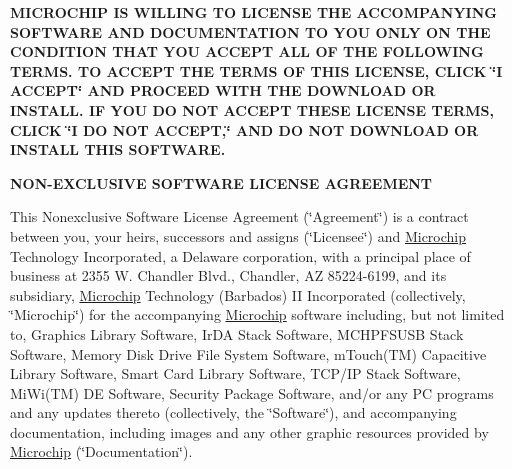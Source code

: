 {\bfseries M\+I\+C\+R\+O\+C\+H\+I\+P I\+S W\+I\+L\+L\+I\+N\+G T\+O L\+I\+C\+E\+N\+S\+E T\+H\+E A\+C\+C\+O\+M\+P\+A\+N\+Y\+I\+N\+G S\+O\+F\+T\+W\+A\+R\+E A\+N\+D D\+O\+C\+U\+M\+E\+N\+T\+A\+T\+I\+O\+N T\+O Y\+O\+U O\+N\+L\+Y O\+N T\+H\+E C\+O\+N\+D\+I\+T\+I\+O\+N T\+H\+A\+T Y\+O\+U A\+C\+C\+E\+P\+T A\+L\+L O\+F T\+H\+E F\+O\+L\+L\+O\+W\+I\+N\+G T\+E\+R\+M\+S. T\+O A\+C\+C\+E\+P\+T T\+H\+E T\+E\+R\+M\+S O\+F T\+H\+I\+S L\+I\+C\+E\+N\+S\+E, C\+L\+I\+C\+K \char`\"{}\+I A\+C\+C\+E\+P\+T\char`\"{} A\+N\+D P\+R\+O\+C\+E\+E\+D W\+I\+T\+H T\+H\+E D\+O\+W\+N\+L\+O\+A\+D O\+R I\+N\+S\+T\+A\+L\+L. I\+F Y\+O\+U D\+O N\+O\+T A\+C\+C\+E\+P\+T T\+H\+E\+S\+E L\+I\+C\+E\+N\+S\+E T\+E\+R\+M\+S, C\+L\+I\+C\+K \char`\"{}\+I D\+O N\+O\+T A\+C\+C\+E\+P\+T,\char`\"{} A\+N\+D D\+O N\+O\+T D\+O\+W\+N\+L\+O\+A\+D O\+R I\+N\+S\+T\+A\+L\+L T\+H\+I\+S S\+O\+F\+T\+W\+A\+R\+E. }

\begin{center}{\bfseries N\+O\+N-\/\+E\+X\+C\+L\+U\+S\+I\+V\+E S\+O\+F\+T\+W\+A\+R\+E L\+I\+C\+E\+N\+S\+E A\+G\+R\+E\+E\+M\+E\+N\+T}\end{center} 

This Nonexclusive Software License Agreement (\char`\"{}\+Agreement\char`\"{}) is a contract between you, your heirs, successors and assigns (\char`\"{}\+Licensee\char`\"{}) and \hyperlink{namespace_microchip}{Microchip} Technology Incorporated, a Delaware corporation, with a principal place of business at 2355 W. Chandler Blvd., Chandler, A\+Z 85224-\/6199, and its subsidiary, \hyperlink{namespace_microchip}{Microchip} Technology (Barbados) I\+I Incorporated (collectively, \char`\"{}\+Microchip\char`\"{}) for the accompanying \hyperlink{namespace_microchip}{Microchip} software including, but not limited to, Graphics Library Software, Ir\+D\+A Stack Software, M\+C\+H\+P\+F\+S\+U\+S\+B Stack Software, Memory Disk Drive File System Software, m\+Touch(\+T\+M) Capacitive Library Software, Smart Card Library Software, T\+C\+P/\+I\+P Stack Software, Mi\+Wi(\+T\+M) D\+E Software, Security Package Software, and/or any P\+C programs and any updates thereto (collectively, the \char`\"{}\+Software\char`\"{}), and accompanying documentation, including images and any other graphic resources provided by \hyperlink{namespace_microchip}{Microchip} (\char`\"{}\+Documentation\char`\"{}).


